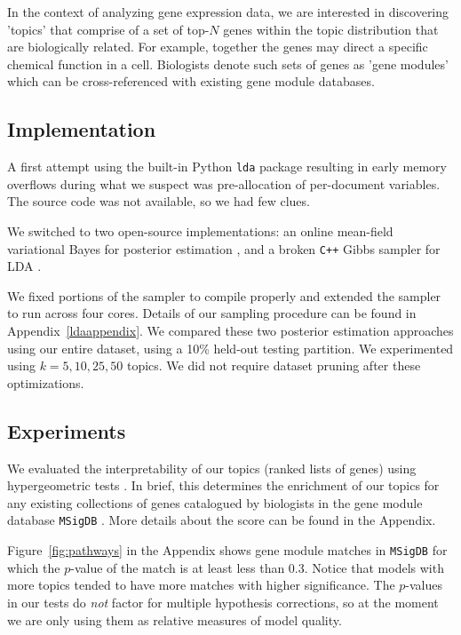 \documentclass{article}
\begin{document}
In the context of analyzing gene expression data, we are interested in discovering 'topics' that comprise of a set of top-$N$ genes within the topic distribution that are biologically related. For example, together the genes may direct a specific chemical function in a cell. Biologists denote such sets of genes as 'gene modules' which can be cross-referenced with existing gene module databases.

\subsection{Implementation} 
A first attempt using the built-in Python \texttt{lda} package resulting in early memory overflows during what we suspect was pre-allocation of per-document variables. The source code was not available, so we had few clues.

We switched to two open-source implementations: an online mean-field variational Bayes for posterior estimation \cite{ovb}, and a broken \texttt{C++} Gibbs sampler for LDA \cite{plda}. 

\nocite{online}

We fixed portions of the sampler to compile properly and extended the sampler to run across four cores. Details of our sampling procedure can be found in Appendix~\ref{ldaappendix}. We compared these two posterior estimation approaches using our entire dataset, using a 10\% held-out testing partition. We experimented using $k=5, 10, 25, 50$ topics. We did not require dataset pruning after these optimizations.

\subsection{Experiments} 
We evaluated the interpretability of our topics (ranked lists of genes) using hypergeometric tests \cite{hg}. In brief, this determines the enrichment of our topics for any existing collections of genes catalogued by biologists in the gene module database \texttt{MSigDB} \cite{msigdb}. More details about the score can be found in the Appendix.

Figure~\ref{fig:pathways} in the Appendix shows gene module matches in \texttt{MSigDB} for which the $p$-value of the match is at least less than 0.3. Notice that models with more topics tended to have more matches with higher significance. The $p$-values in our tests do \textit{not} factor for multiple hypothesis corrections, so at the moment we are only using them as relative measures of model quality.
\end{document}
